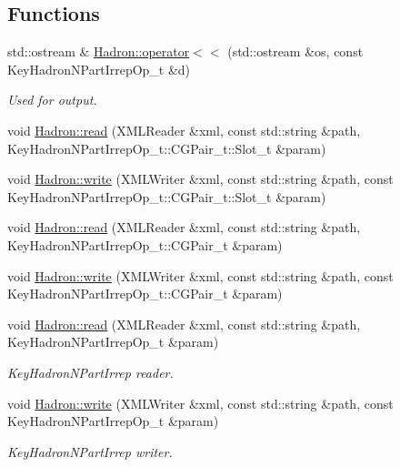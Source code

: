 \subsection*{Functions}
\begin{DoxyCompactItemize}
\item 
std\+::ostream \& \mbox{\hyperlink{namespaceHadron_a6d4dd7ed7a6efa27888f4ea9bdd20e51}{Hadron\+::operator$<$$<$}} (std\+::ostream \&os, const Key\+Hadron\+N\+Part\+Irrep\+Op\+\_\+t \&d)
\begin{DoxyCompactList}\small\item\em Used for output. \end{DoxyCompactList}\item 
void \mbox{\hyperlink{namespaceHadron_ab955c28b5566e0df089a26a611d4bf03}{Hadron\+::read}} (X\+M\+L\+Reader \&xml, const std\+::string \&path, Key\+Hadron\+N\+Part\+Irrep\+Op\+\_\+t\+::\+C\+G\+Pair\+\_\+t\+::\+Slot\+\_\+t \&param)
\item 
void \mbox{\hyperlink{namespaceHadron_a005000ac92ae829ca325627dae07fb51}{Hadron\+::write}} (X\+M\+L\+Writer \&xml, const std\+::string \&path, const Key\+Hadron\+N\+Part\+Irrep\+Op\+\_\+t\+::\+C\+G\+Pair\+\_\+t\+::\+Slot\+\_\+t \&param)
\item 
void \mbox{\hyperlink{namespaceHadron_a7d8926bf48de7c75f93c8ffc8b6bab3e}{Hadron\+::read}} (X\+M\+L\+Reader \&xml, const std\+::string \&path, Key\+Hadron\+N\+Part\+Irrep\+Op\+\_\+t\+::\+C\+G\+Pair\+\_\+t \&param)
\item 
void \mbox{\hyperlink{namespaceHadron_ad194604b0eb61ca7e7ffa89d1ef4c879}{Hadron\+::write}} (X\+M\+L\+Writer \&xml, const std\+::string \&path, const Key\+Hadron\+N\+Part\+Irrep\+Op\+\_\+t\+::\+C\+G\+Pair\+\_\+t \&param)
\item 
void \mbox{\hyperlink{namespaceHadron_ac345c2bc828c82e6774e6bc01e57535e}{Hadron\+::read}} (X\+M\+L\+Reader \&xml, const std\+::string \&path, Key\+Hadron\+N\+Part\+Irrep\+Op\+\_\+t \&param)
\begin{DoxyCompactList}\small\item\em Key\+Hadron\+N\+Part\+Irrep reader. \end{DoxyCompactList}\item 
void \mbox{\hyperlink{namespaceHadron_a6789ce2b1b787b1f3136c9a2836448a1}{Hadron\+::write}} (X\+M\+L\+Writer \&xml, const std\+::string \&path, const Key\+Hadron\+N\+Part\+Irrep\+Op\+\_\+t \&param)
\begin{DoxyCompactList}\small\item\em Key\+Hadron\+N\+Part\+Irrep writer. \end{DoxyCompactList}\item 

\end{DoxyCompactItemize}
